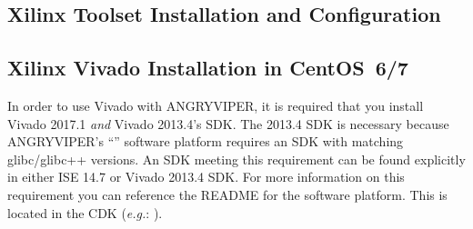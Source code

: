 \begin{flushleft}
\section{Xilinx Toolset Installation and Configuration}
\subsection{Xilinx Vivado Installation in CentOS~6/7}
\label{sec:viv_intro}
\begin{flushleft}
In order to use Vivado with ANGRYVIPER, it is required that you install Vivado 2017.1 \textit{and} Vivado 2013.4's SDK. The 2013.4 SDK is necessary because ANGRYVIPER's ``'' software platform requires an SDK with matching glibc/glibc++ versions. An SDK meeting this requirement can be found explicitly in either ISE 14.7 or Vivado 2013.4 SDK. For more information on this requirement you can reference the README for the  software platform. This is located in the CDK (\textit{e.g.}: ).

\end{flushleft}
\end{flushleft}

